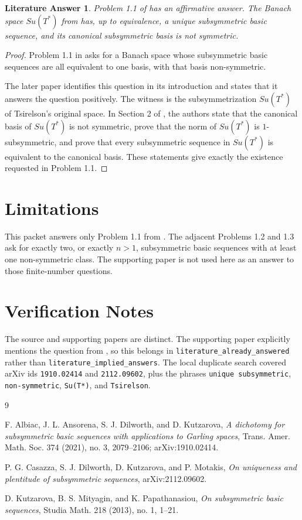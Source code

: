 \documentclass[11pt]{article}
\newtheorem*{theorem}{Literature Answer}
\begin{document}
\begin{theorem}
Problem 1.1 of \cite{AADK} has an affirmative answer. The Banach space
\(Su(T^*)\) from \cite{CDKM} has, up to equivalence, a unique subsymmetric
basic sequence, and its canonical subsymmetric basis is not symmetric.
\end{theorem}

\begin{proof}
Problem 1.1 in \cite{AADK} asks for a Banach space whose subsymmetric basic
sequences are all equivalent to one basis, with that basis non-symmetric.

The later paper \cite{CDKM} identifies this question in its introduction and
states that it answers the question positively. The witness is the
subsymmetrization \(Su(T^*)\) of Tsirelson's original space. In Section 2 of
\cite{CDKM}, the authors state that the canonical basis of \(Su(T^*)\) is not
symmetric, prove that the norm of \(Su(T^*)\) is \(1\)-subsymmetric, and prove
that every subsymmetric sequence in \(Su(T^*)\) is equivalent to the canonical
basis. These statements give exactly the existence requested in Problem 1.1.
\end{proof}

\section*{Limitations}

This packet answers only Problem 1.1 from \cite{AADK}. The adjacent Problems
1.2 and 1.3 ask for exactly two, or exactly \(n>1\), subsymmetric basic
sequences with at least one non-symmetric class. The supporting paper is not
used here as an answer to those finite-number questions.

\section*{Verification Notes}

The source and supporting papers are distinct. The supporting paper explicitly
mentions the question from \cite{AADK}, so this belongs in
\texttt{literature\_already\_answered} rather than
\texttt{literature\_implied\_answers}. The local duplicate search covered
arXiv ids \texttt{1910.02414} and \texttt{2112.09602}, plus the phrases
\texttt{unique subsymmetric}, \texttt{non-symmetric}, \texttt{Su(T*)}, and
\texttt{Tsirelson}.

\begin{thebibliography}{9}

F. Albiac, J. L. Ansorena, S. J. Dilworth, and D. Kutzarova,
\emph{A dichotomy for subsymmetric basic sequences with applications to
Garling spaces}, Trans. Amer. Math. Soc. 374 (2021), no. 3, 2079--2106;
arXiv:1910.02414.

P. G. Casazza, S. J. Dilworth, D. Kutzarova, and P. Motakis,
\emph{On uniqueness and plentitude of subsymmetric sequences},
arXiv:2112.09602.

D. Kutzarova, B. S. Mityagin, and K. Papathanasiou,
\emph{On subsymmetric basic sequences}, Studia Math. 218 (2013), no. 1,
1--21.

\end{thebibliography}
\end{document}
